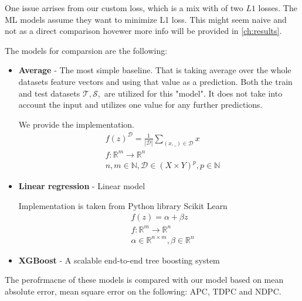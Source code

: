 One issue arrises from our custom loss, which is a mix with of two $L1$ losses. The ML models assume they want to minimize L1 loss. This might seem naive and not as a direct comparison hovewer more info will be provided in \ref{ch:results}.

The models for comparsion are the following:

\begin{itemize}
    \item \textbf{Average} - The most simple baseline. That is taking average over the whole datasets feature vectors and using that value as a prediction. Both the train and test datasets $\mathcal{T},\mathcal{S},$ are utilized for this "model". It does not take into account the input and utilizes one value for any further predictions.

          We provide the implementation.
          \begin{equation}
              \begin{split}
                   & f(z)^{\mathcal{D}}  = \frac{1}{|\mathcal{D}|} \sum_{(x,\_) \in \mathcal{D}} x \\
                   & f: \mathbb{R}^m \rightarrow \mathbb{R}^n                                      \\
                   & n,m \in \mathbb{N}, \mathcal{D} \in  (X \times Y)^p, p \in \mathbb{N}
              \end{split}
          \end{equation}


    \item \textbf{Linear regression} - Linear model

          Implementation is taken from Python library Scikit Learn 
          \begin{equation}
              \begin{split}
                   & f(z) = \alpha  + \beta z                                   \\
                   & f: \mathbb{R}^m \rightarrow \mathbb{R}^n                   \\
                   & \alpha \in \mathbb{R}^{n \times m}, \beta \in \mathbb{R}^n
              \end{split}
          \end{equation}
    \item \textbf{XGBoost} - A scalable end-to-end tree boosting system 
\end{itemize}

The perofrmacne of these models is compared with our model based on mean absolute error, mean square error on the following: \acrlong{APC}, \acrlong{TDPC} and \acrlong{NDPC}.